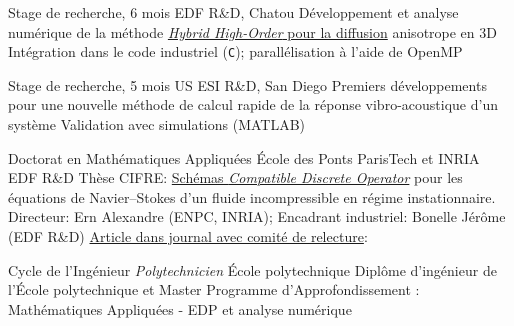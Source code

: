 \documentclass[french]{RMcv}
\begin{document}
%
%
        {Stage de recherche, 6 mois}%
        {EDF R\&D, Chatou}%
        {D\'eveloppement et analyse num\'erique de la m\'ethode \href{\tesilink}{\emph{Hybrid High-Order} pour la diffusion} anisotrope en 3D}%
        {Int\'egration dans le code industriel \cs{} (\texttt{C}); parall\'elisation \`a l'aide de OpenMP}


%
%
        {Stage de recherche, 5 mois}%
        {US ESI R\&D, San Diego}%
        {Premiers d\'eveloppements pour une nouvelle m\'ethode de calcul rapide de la r\'eponse vibro-acoustique d'un syst\`eme}%
        {Validation avec simulations (MATLAB)}


%


\vspace{8pt}



%
        {Doctorat en Math\'ematiques Appliqu\'ees}%
        {\'Ecole des Ponts ParisTech et INRIA EDF R\&D}%
        {Th\`ese CIFRE: \href{\PhDlink}{Sch\'emas \emph{Compatible Discrete Operator}} pour les \'equations de Navier–Stokes d’un fluide incompressible en r\'egime instationnaire. Directeur: Ern Alexandre (ENPC, INRIA); Encadrant industriel: Bonelle J\'er\^ome (EDF R\&D)}%
        {\href{\articlelink}{Article dans journal avec comit\'e de relecture}: \article{}}



%
%
        {Cycle de l'Ing\'enieur \textit{Polytechnicien}}%
        {\'Ecole polytechnique}%
        {Dipl\^ome d'ing\'enieur de l'\'Ecole polytechnique et Master}%
        {Programme d'Approfondissement : Math\'ematiques Appliqu\'ees - EDP et analyse num\'erique}
\end{document}

